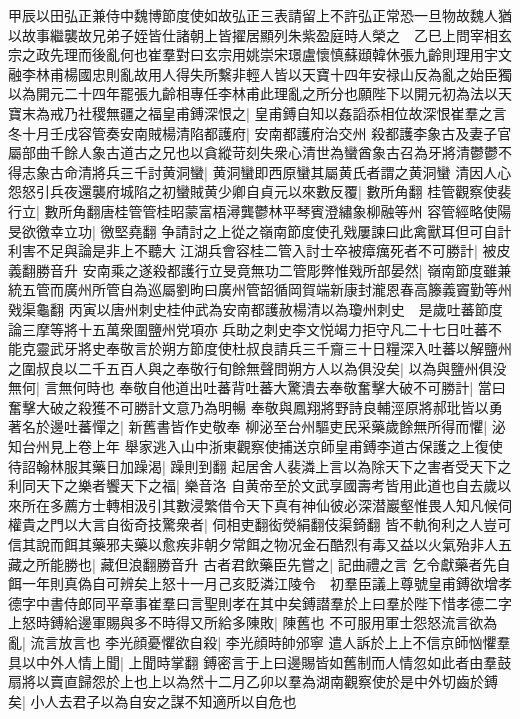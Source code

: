 甲辰以田弘正兼侍中魏博節度使如故弘正三表請留上不許弘正常恐一旦物故魏人猶以故事繼襲故兄弟子姪皆仕諸朝上皆擢居顯列朱紫盈庭時人榮之　乙巳上問宰相玄宗之政先理而後亂何也崔羣對曰玄宗用姚崇宋璟盧懷慎蘇頲韓休張九齡則理用宇文融李林甫楊國忠則亂故用人得失所繫非輕人皆以天寶十四年安禄山反為亂之始臣獨以為開元二十四年罷張九齡相專任李林甫此理亂之所分也願陛下以開元初為法以天寶末為戒乃社稷無疆之福皇甫鎛深恨之|{
	皇甫鎛自知以姦謟忝相位故深恨崔羣之言}
冬十月壬戌容管奏安南賊楊清陷都護府|{
	安南都護府治交州}
殺都護李象古及妻子官屬部曲千餘人象古道古之兄也以貪縱苛刻失衆心清世為蠻酋象古召為牙將清鬱鬱不得志象古命清將兵三千討黄洞蠻|{
	黄洞蠻即西原蠻其屬黄氏者謂之黄洞蠻}
清因人心怨怒引兵夜還襲府城陷之初蠻賊黄少卿自貞元以來數反覆|{
	數所角翻}
桂管觀察使裴行立|{
	數所角翻唐桂管管桂昭蒙富梧潯龔鬱林平琴賓澄繡象柳融等州}
容管經略使陽旻欲徼幸立功|{
	徼堅堯翻}
争請討之上從之嶺南節度使孔戣屢諫曰此禽獸耳但可自計利害不足與論是非上不聽大江湖兵會容桂二管入討士卒被瘴癘死者不可勝計|{
	被皮義翻勝音升}
安南乘之遂殺都護行立旻竟無功二管彫弊惟戣所部晏然|{
	嶺南節度雖兼統五管而廣州所管自為巡屬劉昫曰廣州管韶循岡賀端新康封瀧恩春高籐義竇勤等州戣渠龜翻}
丙寅以唐州刺史桂仲武為安南都護赦楊清以為瓊州刺史　是歲吐蕃節度論三摩等將十五萬衆圍鹽州党項亦兵助之刺史李文悦竭力拒守凡二十七日吐蕃不能克靈武牙將史奉敬言於朔方節度使杜叔良請兵三千齎三十日糧深入吐蕃以解鹽州之圍叔良以二千五百人與之奉敬行旬餘無聲問朔方人以為俱没矣|{
	以為與鹽州俱没}
無何|{
	言無何時也}
奉敬自他道出吐蕃背吐蕃大驚潰去奉敬奮擊大破不可勝計|{
	當曰奮擊大破之殺獲不可勝計文意乃為明暢}
奉敬與鳳翔將野詩良輔涇原將郝玭皆以勇著名於邊吐蕃憚之|{
	新舊書皆作史敬奉}
柳泌至台州驅吏民采藥歲餘無所得而懼|{
	泌知台州見上卷上年}
舉家逃入山中浙東觀察使捕送京師皇甫鎛李道古保護之上復使待詔翰林服其藥日加躁渴|{
	躁則到翻}
起居舍人裴潾上言以為除天下之害者受天下之利同天下之樂者饗天下之福|{
	樂音洛}
自黄帝至於文武享國壽考皆用此道也自去歲以來所在多薦方士轉相汲引其數浸繁借令天下真有神仙彼必深潜巖壑惟畏人知凡候伺權貴之門以大言自衒奇技驚衆者|{
	伺相吏翻衒熒絹翻伎渠錡翻}
皆不軌徇利之人豈可信其說而餌其藥邪夫藥以愈疾非朝夕常餌之物况金石酷烈有毒又益以火氣殆非人五藏之所能勝也|{
	藏但浪翻勝音升}
古者君飲藥臣先嘗之|{
	記曲禮之言}
乞令獻藥者先自餌一年則真偽自可辨矣上怒十一月己亥貶潾江陵令　初羣臣議上尊號皇甫鎛欲增孝德字中書侍郎同平章事崔羣曰言聖則孝在其中矣鎛譛羣於上曰羣於陛下惜孝德二字上怒時鎛給邊軍賜與多不時得又所給多陳敗|{
	陳舊也}
不可服用軍士怨怒流言欲為亂|{
	流言放言也}
李光顔憂懼欲自殺|{
	李光顔時帥邠寧}
遣人訴於上上不信京師忷懼羣具以中外人情上聞|{
	上聞時掌翻}
鎛密言于上曰邊賜皆如舊制而人情忽如此者由羣鼓扇將以賣直歸怨於上也上以為然十二月乙卯以羣為湖南觀察使於是中外切齒於鎛矣|{
	小人去君子以為自安之謀不知適所以自危也}

